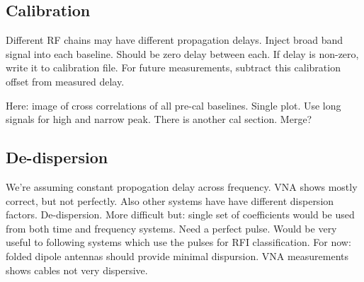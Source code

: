 \subsection{Calibration}
Different RF chains may have different propagation delays. 
Inject broad band signal into each baseline. Should be zero delay between each. 
If delay is non-zero, write it to calibration file.
For future measurements, subtract this calibration offset from measured delay. 

Here: image of cross correlations of all pre-cal baselines. Single plot. Use long signals for high and narrow peak.
There is another cal section. Merge?

\subsection{De-dispersion}
We're assuming constant propogation delay across frequency. VNA shows mostly correct, but not perfectly. Also other systems have have different dispersion factors. 
De-dispersion. 
More difficult but: single set of coefficients would be used from both time and frequency systems. 
Need a perfect pulse.
Would be very useful to following systems which use the pulses for RFI classification. 
For now: folded dipole antennas should provide minimal dispursion. 
VNA measurements shows cables not very dispersive.
